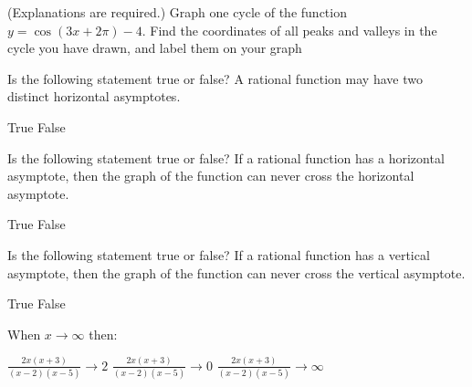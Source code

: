 \documentclass[11pt,answers]{exam}
\begin{document}
\begin{questions}

\question[4] (Explanations are required.) Graph one cycle of the function $\displaystyle y = \cos(3x + 2\pi) - 4$. Find the coordinates of all peaks and valleys  in the cycle you have drawn, and label them on your graph

\fillwithdottedlines{4cm}


\newpage
\question[1] Is the following statement true or false? A rational function may have two distinct horizontal asymptotes.
\begin{oneparchoices}
\choice True \choice False
\end{oneparchoices}
\question[1] Is the following statement true or false? If a rational function has a horizontal asymptote, then the graph of the function can never cross the horizontal asymptote.
\begin{oneparchoices}
\choice True
\choice False
\end{oneparchoices}
\question[1] Is the following statement true or false? If a rational function has a vertical asymptote, then the graph of the function can never cross the vertical asymptote.
\begin{oneparchoices}
\choice True
\choice False
\end{oneparchoices}
\question[1] When $x\to \infty$ then:

\begin{oneparchoices}
\choice  $\displaystyle \frac{2x(x+3)}{(x-2)(x-5)}\to 2$
\choice  $\displaystyle \frac{2x(x+3)}{(x-2)(x-5)}\to 0$
\choice  $\displaystyle \frac{2x(x+3)}{(x-2)(x-5)}\to \infty$
\end{oneparchoices}


\end{questions}
\end{document}
